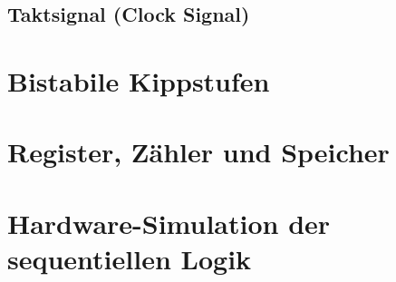 \documentclass[12pt]{report}
\begin{document}
\subsection{Taktsignal (Clock Signal)}

\section{Bistabile Kippstufen}

\section{Register, Zähler und Speicher}

\section{Hardware-Simulation der sequentiellen Logik}
\end{document}
